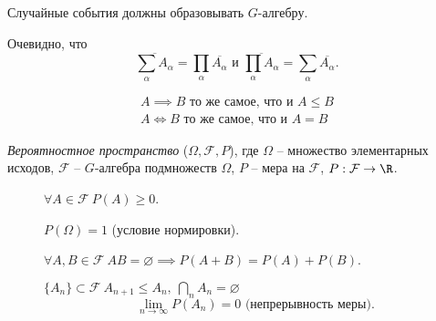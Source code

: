 \begin{remark}
  Случайные события должны образовывать $G$-алгебру.
\end{remark}

\begin{remark}
  Очевидно, что 
  \[
    \overline{\sum_{\alpha}A_{\alpha}}=\prod_{\alpha}\overline{A_{\alpha}} \text{ и } \overline{\prod_{\alpha}A_{\alpha}} = \sum_{\alpha}\overline{A_{\alpha}}.
  \]
\end{remark}

\begin{remark}
  \[
    \begin{array}{c}
      A \implies B \text{ то же самое, что и } A \leqslant B \\
      A \iff B \text{ то же самое, что и } A = B
    \end{array}
  \]
\end{remark}

\begin{definition}
  \emph{Вероятностное пространство} ($\Omega,\mathcal{F},P$), где $\Omega$ -- множество элементарных исходов, $\mathcal{F}$ -- $G$-алгебра подмножеств $\Omega$, $P$ -- мера на $\mathcal{F}$, $P: \mathcal{F} \rightarrow \R $.
  \begin{description}
    \item[] $\forall A \in \mathcal{F} \ P(A) \geqslant 0$.
    \item[] $P(\Omega) = 1$ (условие нормировки). 
    \item[] $\forall A,B \in \mathcal{F} \ AB = \varnothing \implies P(A+B) = P(A) + P(B)$.
    \item[] $\{A_{n}\}\subset \mathcal{F} \ A_{n+1} \leqslant A_n, \ \bigcap_n A_n = \varnothing$
    \[
      \lim_{n \rightarrow \infty}P(A_n) = 0 \text{ (непрерывность меры)}. 
    \]
  \end{description}
\end{definition}

